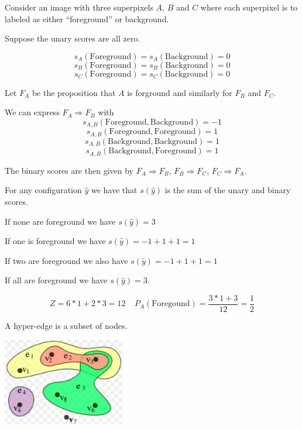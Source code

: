 
Consider an image with three superpixels $A$, $B$ and $C$ where
each superpixel is to labeled as either ``foreground'' or background.

\vfill
Suppose the unary scores are all zero.

\vfill
$$s_A(\mathrm{Foreground}) = s_A(\mathrm{Background}) = 0$$
$$s_B(\mathrm{Foreground}) = s_B(\mathrm{Background}) = 0$$
$$s_C(\mathrm{Foreground}) = s_C(\mathrm{Background}) = 0$$



\vfill
Let $F_A$ be the proposition that $A$ is forground and similarly for $F_B$ and $F_C$.

\vfill
We can express $F_A \Rightarrow F_B$ with
$$s_{A,B}(\mathrm{Foreground},\mathrm{Background}) = -1$$
$$s_{A,B}(\mathrm{Foreground},\mathrm{Foreground}) = 1$$
$$s_{A,B}(\mathrm{Background},\mathrm{Background}) = 1$$
$$s_{A,B}(\mathrm{Background},\mathrm{Foreground}) = 1$$

\vfill
The binary scores are then given by
$F_A \Rightarrow F_B$, $F_B \Rightarrow F_C$, $F_C \Rightarrow F_A$.


For any configuration $\hat{y}$ we have that $s(\hat{y})$ is the sum of the unary and binary scores.

\vfill
If none are foreground we have $s(\hat{y}) = 3$

\vfill
If one is foreground we have $s(\hat{y}) = -1 + 1+ 1 = 1$

\vfill
If two are foreground we also have $s(\hat{y}) = -1 + 1+ 1 = 1$

\vfill
If all are foreground we have $s(\hat{y}) = 3$.

\vfill
$$Z = 6*1 + 2*3 = 12\;\;\;\;P_A(\mathrm{Foregound}) = \frac{3*1 + 3}{12} = \frac{1}{2}$$




A hyper-edge is a subset of nodes.

\vfill
\centerline{\includegraphics[height = 1.5in]{../images/HyperGraph}}


